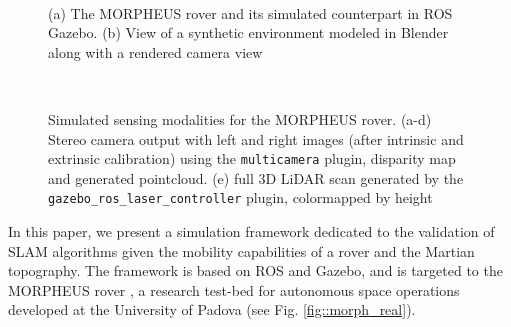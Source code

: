 \documentclass[conference]{IEEEtran}  %
\newcommand{\SCmod}[1]{{\color{green} {#1}}}
\begin{document}
\begin{figure}[t]
    \centering
     \hfill
      \\
    \caption{(a) The MORPHEUS rover \cite{giubilato2019evaluation} and its simulated counterpart in ROS Gazebo. (b) View of a synthetic environment modeled in Blender along with a rendered camera view}
    \label{fig:my_label}
\end{figure}
\begin{figure*}[!htb]
    \centering
    \begin{minipage}[b]{.49\textwidth}
         \hfill
          \\
         \hfill
    \end{minipage}
    \hfill
    \begin{minipage}[b]{.49\textwidth}
    \end{minipage}
    \caption{Simulated sensing modalities for the MORPHEUS rover. (a-d) Stereo camera output with left and right images (after intrinsic and extrinsic calibration) using the \texttt{multicamera} plugin, disparity map and generated pointcloud. (e) full 3D LiDAR scan generated by the \texttt{gazebo\_ros\_laser\_controller} plugin, colormapped by height}
    \label{fig:my_label}
\end{figure*}
In this paper, we present a simulation framework dedicated to the validation of SLAM algorithms given the mobility capabilities of a rover and the Martian topography. The framework is based on ROS and Gazebo, and is targeted to the MORPHEUS rover \cite{giubilato2019evaluation}, a research test-bed for autonomous space operations developed at the University of Padova (see Fig. \ref{fig::morph_real}).
\end{document}
